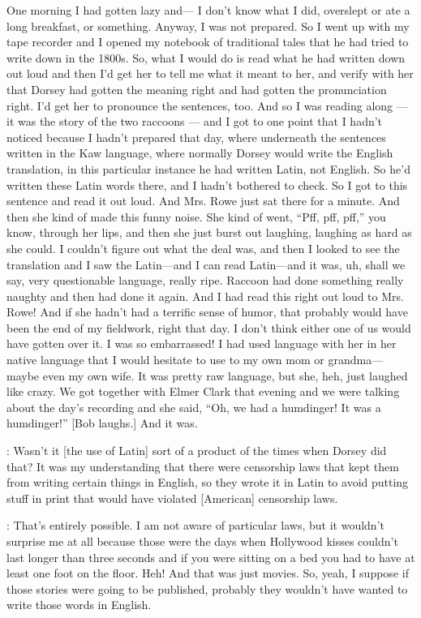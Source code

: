 \documentclass[output=paper]{LSP/langsci}
\begin{document}
One morning I had gotten lazy and--- I don't know what I did, overslept or ate a long breakfast, or something. Anyway, I was not prepared. So I went up with my tape recorder and I opened my notebook of  traditional tales that he had tried to write down in the 1800s. So, what I would do is read what he had written down out loud and then I'd get her to tell me what it meant to her, and verify with her that Dorsey had gotten the meaning right and had gotten the pronunciation right. I'd get her to pronounce the sentences, too. And so I was reading along --- it was the story of the two raccoons --- and I got to one point that I hadn't noticed because I hadn't prepared that day, where underneath the sentences written in the Kaw language, where normally Dorsey would write the English translation, in this particular instance he had written Latin, not English. So he'd written these Latin words there, and I hadn't bothered to check. So I got to this sentence and read it out loud. And Mrs. Rowe just sat there for a minute. And then she kind of made this funny noise. She kind of went, ``Pff, pff, pff,'' you know, through her lips, and then she just burst out laughing, laughing as hard as she could. I couldn't figure out what the deal was, and then I looked to see the translation and I saw the Latin---and I can read Latin---and it was, uh, shall we say, very questionable language, really ripe. Raccoon had done something really naughty and then had done it again. And I had read this right out loud to Mrs. Rowe! And if she hadn't had a terrific sense of humor, that probably would have been the end of my fieldwork, right that day. I don't think either one of us would have gotten over it. I was so embarrassed! I had used language with her in her native language that I would hesitate to use to my own mom or grandma---maybe even my own wife. It was pretty raw language, but she, heh, just laughed like crazy. We got together with Elmer Clark that evening and we were talking about the day's recording and she said, ``Oh, we had a humdinger! It was a humdinger!'' [Bob laughs.] And it was.

: Wasn't it [the use of Latin] sort of a product of the times when Dorsey did that? It was my understanding that there were censorship laws that kept them from writing certain things in English, so they wrote it in Latin to avoid putting stuff in print that would have violated [American] censorship laws.

: That's entirely possible. I am not aware of particular laws, but it wouldn't surprise me at all because those were the days when Hollywood kisses couldn't last longer than three seconds and if you were sitting on a bed you had to have at least one foot on the floor. Heh! And that was just movies. So, yeah, I suppose if those stories were going to be published, probably they wouldn't have wanted to write those words in English.
\end{document}
